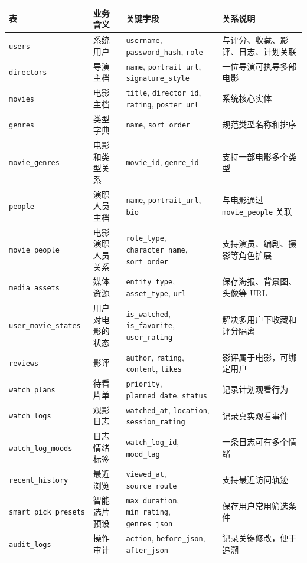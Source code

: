\documentclass[
]{ctexart}
\begin{document}
\begin{longtable}[]{@{}
  >{\raggedright\arraybackslash}p{}
  >{\raggedright\arraybackslash}p{}
  >{\raggedright\arraybackslash}p{}
  >{\raggedright\arraybackslash}p{}@{}}
\toprule
表 & 业务含义 & 关键字段 & 关系说明 \\
\midrule
\endhead
\texttt{users} & 系统用户 & \texttt{username}, \texttt{password\_hash},
\texttt{role} & 与评分、收藏、影评、日志、计划关联 \\
\texttt{directors} & 导演主档 & \texttt{name}, \texttt{portrait\_url},
\texttt{signature\_style} & 一位导演可执导多部电影 \\
\texttt{movies} & 电影主档 & \texttt{title}, \texttt{director\_id},
\texttt{rating}, \texttt{poster\_url} & 系统核心实体 \\
\texttt{genres} & 类型字典 & \texttt{name}, \texttt{sort\_order} &
规范类型名称和排序 \\
\texttt{movie\_genres} & 电影和类型关系 & \texttt{movie\_id},
\texttt{genre\_id} & 支持一部电影多个类型 \\
\texttt{people} & 演职人员主档 & \texttt{name}, \texttt{portrait\_url},
\texttt{bio} & 与电影通过 \texttt{movie\_people} 关联 \\
\texttt{movie\_people} & 电影演职人员关系 & \texttt{role\_type},
\texttt{character\_name}, \texttt{sort\_order} &
支持演员、编剧、摄影等角色扩展 \\
\texttt{media\_assets} & 媒体资源 & \texttt{entity\_type},
\texttt{asset\_type}, \texttt{url} & 保存海报、背景图、头像等 URL \\
\texttt{user\_movie\_states} & 用户对电影的状态 & \texttt{is\_watched},
\texttt{is\_favorite}, \texttt{user\_rating} &
解决多用户下收藏和评分隔离 \\
\texttt{reviews} & 影评 & \texttt{author}, \texttt{rating},
\texttt{content}, \texttt{likes} & 影评属于电影，可绑定用户 \\
\texttt{watch\_plans} & 待看片单 & \texttt{priority},
\texttt{planned\_date}, \texttt{status} & 记录计划观看行为 \\
\texttt{watch\_logs} & 观影日志 & \texttt{watched\_at},
\texttt{location}, \texttt{session\_rating} & 记录真实观看事件 \\
\texttt{watch\_log\_moods} & 日志情绪标签 & \texttt{watch\_log\_id},
\texttt{mood\_tag} & 一条日志可有多个情绪 \\
\texttt{recent\_history} & 最近浏览 & \texttt{viewed\_at},
\texttt{source\_route} & 支持最近访问轨迹 \\
\texttt{smart\_pick\_presets} & 智能选片预设 & \texttt{max\_duration},
\texttt{min\_rating}, \texttt{genres\_json} & 保存用户常用筛选条件 \\
\texttt{audit\_logs} & 操作审计 & \texttt{action},
\texttt{before\_json}, \texttt{after\_json} & 记录关键修改，便于追溯 \\
\bottomrule
\end{longtable}
\end{document}
